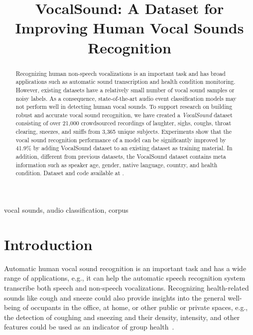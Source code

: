 \documentclass{article}
\title{VocalSound: A Dataset for Improving Human Vocal Sounds Recognition}
\newcommand{\squeezeup}{\vspace{-1.6mm}}
\begin{document}
\maketitle
\begin{abstract}














Recognizing human non-speech vocalizations is an important task and has broad applications such as automatic sound transcription and health condition monitoring. However, existing datasets have a relatively small number of vocal sound samples or noisy labels. As a consequence, state-of-the-art audio event classification models may not perform well in detecting human vocal sounds. To support research on building robust and accurate vocal sound recognition, we have created a \emph{VocalSound} dataset consisting of over 21,000 crowdsourced recordings of laughter, sighs, coughs, throat clearing, sneezes, and sniffs from 3,365 unique subjects. Experiments show that the vocal sound recognition performance of a model can be significantly improved by 41.9\% by adding VocalSound dataset to an existing dataset as training material. In addition, different from previous datasets, the VocalSound dataset contains meta information such as speaker age, gender, native language, country, and health condition. Dataset and code available at \href{https://github.com/yuangongnd/vocalsound}{\color{blue}{https://github.com/yuangongnd/vocalsound}}.

\end{abstract}
\begin{keywords}
vocal sounds, audio classification, corpus
\end{keywords}
\section{Introduction}
\squeezeup

Automatic human vocal sound recognition is an important task and has a wide range of applications, e.g., it can help the automatic speech recognition system transcribe both speech and non-speech vocalizations. Recognizing health-related sounds like cough and sneeze could also provide insights into the general well-being of occupants in the office, at home, or other public or private spaces, e.g., the detection of coughing and sneezing and their density, intensity, and other features could be used as an indicator of group health~\cite{kvapilova2019continuous,simou2021universal,larson2011accurate}. 
\end{document}
